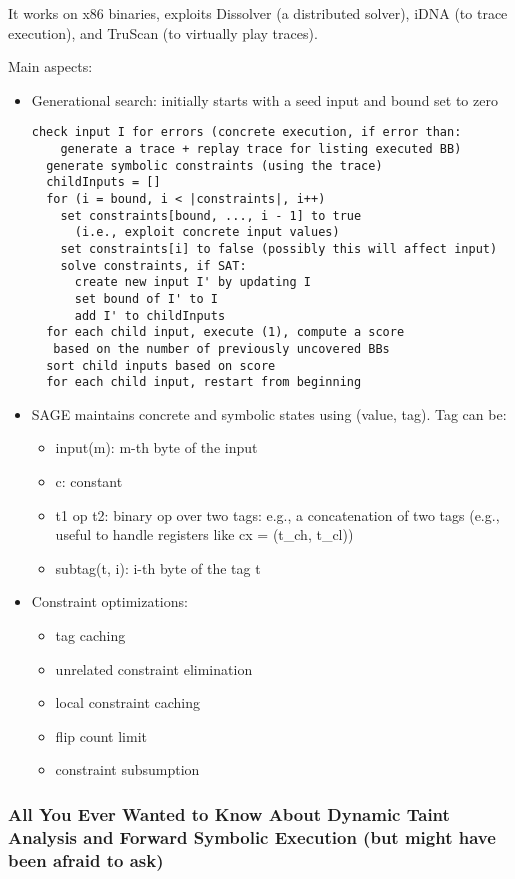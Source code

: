 It works on x86 binaries, exploits Dissolver (a distributed solver), iDNA (to trace execution), and TruScan (to virtually play traces). 

Main aspects:
\begin{itemize}
  \item Generational search: initially starts with a seed input and bound set to zero
    \begin{lstlisting}[mathescape=true]
  check input I for errors (concrete execution, if error than: 
    generate a trace + replay trace for listing executed BB)
  generate symbolic constraints (using the trace)
  childInputs = []
  for (i = bound, i < |constraints|, i++)
    set constraints[bound, ..., i - 1] to true 
      (i.e., exploit concrete input values)
    set constraints[i] to false (possibly this will affect input)
    solve constraints, if SAT:
      create new input I' by updating I
      set bound of I' to I
      add I' to childInputs 
  for each child input, execute (1), compute a score
   based on the number of previously uncovered BBs
  sort child inputs based on score
  for each child input, restart from beginning 
    \end{lstlisting}
    \item SAGE maintains concrete and symbolic states using (value, tag). Tag can be:
      \begin{itemize}
        \item input(m): m-th byte of the input
        \item c: constant
        \item t1 op t2: binary op over two tags: e.g., a concatenation of two tags (e.g., useful to handle registers like cx = (t\_ch, t\_cl))
        \item subtag(t, i): i-th byte of the tag t
      \end{itemize}
    \item Constraint optimizations:
      \begin{itemize}
        \item tag caching
        \item unrelated constraint elimination
        \item local constraint caching
        \item flip count limit
        \item constraint subsumption
      \end{itemize}
\end{itemize}

\subsubsection{\cite{SAB-SP10} All You Ever Wanted to Know About Dynamic Taint Analysis and Forward Symbolic Execution (but might have been afraid to ask)}

